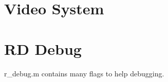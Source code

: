 \section{Video System}
\label{label_next_video_system}

\section{RD Debug}

r\_debug.m contains many flags to help debugging.

